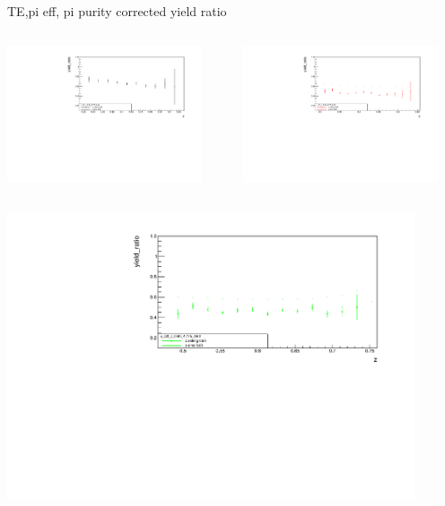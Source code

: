 \begin{frame}{TE,pi eff, pi purity corrected yield ratio}
\begin{columns}
\begin{column}[T]{0.5\textwidth}
\includegraphics[width = 0.9\textwidth]{results/yield/statistics_corr/x_Q2_z_60_4775_40_ratio.pdf}
\end{column}
\begin{column}[T]{0.5\textwidth}
\includegraphics[width = 0.9\textwidth]{results/yield/statistics_corr/x_Q2_z_60_4775_50_ratio.pdf}
\end{column}
\end{columns}
\begin{columns}
\begin{column}[T]{0.5\textwidth}
\includegraphics[width = 0.9\textwidth]{results/yield/statistics_corr/x_Q2_z_60_4775_60_ratio.pdf}

\end{column}
\end{columns}
\end{frame}
